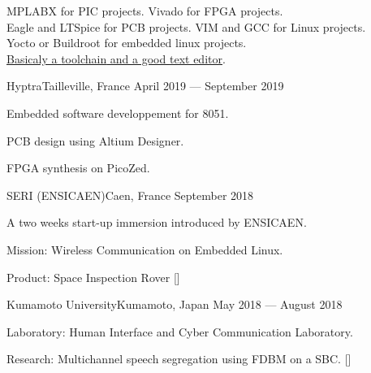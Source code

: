\documentclass{faresume}
\begin{document}
\begin{column}[\leftcolumnwidth]


        \addcontent
        {
            \textmd{MPLABX} for PIC projects.
            \textmd{Vivado} for FPGA projects.\\
            \textmd{Eagle} and \textmd{LTSpice} for PCB projects.
            \textmd{VIM} and \textmd{GCC} for Linux projects.\\
            \textmd{Yocto} or \textmd{Buildroot} for embedded linux projects.\\
            \underline{Basicaly a \textmd{toolchain} and a good \textmd{text editor}}.
        }{}{}{}{}


            {Hyptra}{Tailleville, France}
            {April 2019 --- September 2019}
            {
                \begin{additems}
                    \item Embedded software developpement for 8051.
                    \item PCB design using Altium Designer.
                    \item FPGA synthesis on PicoZed.
                \end{additems}
            }

            {SERI (ENSICAEN)}{Caen, France}
            {September 2018}
            {
                \begin{additems}
                    \item A two weeks start-up immersion introduced by ENSICAEN.
                    \item Mission: Wireless Communication on Embedded Linux.
                    \item Product: Space Inspection Rover []
                \end{additems}
            }

            {Kumamoto University}{Kumamoto, Japan}
            {May 2018 --- August 2018}
            {
                \begin{additems}
                    \item Laboratory: Human Interface and Cyber Communication Laboratory.
                    \item Research: Multichannel speech segregation using FDBM on a SBC. []
                \end{additems}
            }


\end{column}
\end{document}
